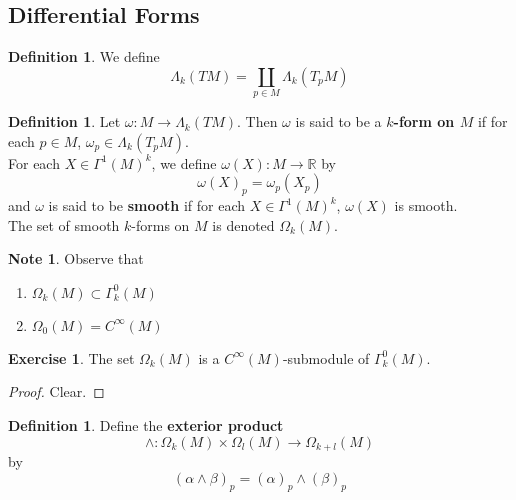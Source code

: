 \documentclass[12pt]{amsart}
\theoremstyle{definition}
\newtheorem{defn}[definition]{Definition}
\newtheorem{note}[definition]{Note}
\newtheorem{ex}[definition]{Exercise}
\newcommand{\al}{\alpha}
\newcommand{\Gam}{\Gamma}
\newcommand{\Lam}{\Lambda}
\newcommand{\om}{\omega}
\newcommand{\Om}{\Omega}
\newcommand{\R}{\mathbb{R}}
\begin{document}
	
	
	
	
	
	
	
	
	
	
	
	
	
	
	
	
	
	
	

	
	\newpage	
	\subsection{Differential Forms}
	
	\begin{defn}
		We define $$\Lam_k (TM) = \coprod_{p \in M} \Lam_k(T_p M)$$
	\end{defn}
	
	\begin{defn}
		Let $\om: M \rightarrow \Lam_k (TM)$. Then $\om$ is said to be a \textbf{$k$-form on $M$} if for each $p \in M$, $\om_p \in \Lam_k(T_pM)$.\\
		For each $X \in \Gam^1(M)^k$, we define $\om(X) : M \rightarrow \R$ by $$\om(X)_p = \om_p(X_p)$$
		and $\om$ is said to be \textbf{smooth} if for each $X \in \Gam^1(M)^k$, $\om(X)$ is smooth.\\
		The set of smooth $k$-forms on $M$ is denoted $\Om_k(M)$.\\
	\end{defn} 

	\begin{note}
		Observe that 
		\begin{enumerate}
		\item $\Om_k(M) \subset \Gamma^0_k(M)$
		\item $\Om_0(M) = C^{\infty}(M)$
		\end{enumerate}
	\end{note}
	
	\begin{ex}
	The set $\Om_k(M)$ is a $C^{\infty}(M)$-submodule of $\Gam^0_k(M)$.
	\end{ex}
	
	\begin{proof}
	Clear.
	\end{proof}

	

	\begin{defn}
		Define the \textbf{exterior product} $$\wedge: \Om_k(M) \times \Om_l(M) \rightarrow \Om_{k+l}(M) $$ by $$(\al \wedge \beta)_p = (\al)_p \wedge (\beta)_p$$
	\end{defn}
	
\end{document}
